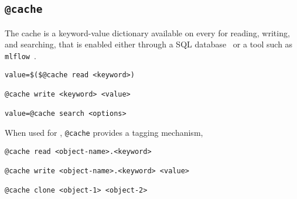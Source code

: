 \subsection{\texttt{@cache}}\label{cache}

The cache is a keyword-value dictionary available on every  for reading, writing, and searching, that is enabled either through a SQL database~ or a tool such as \texttt{mlflow}~\cite{mlflow}.
%
\begin{verbatim}
value=$($@cache read <keyword>)

@cache write <keyword> <value>

value=@cache search <options>
\end{verbatim}
%
When used for , \texttt{@cache} provides a tagging mechanism,
%
\begin{verbatim}
@cache read <object-name>.<keyword>

@cache write <object-name>.<keyword> <value>

@cache clone <object-1> <object-2>
\end{verbatim}